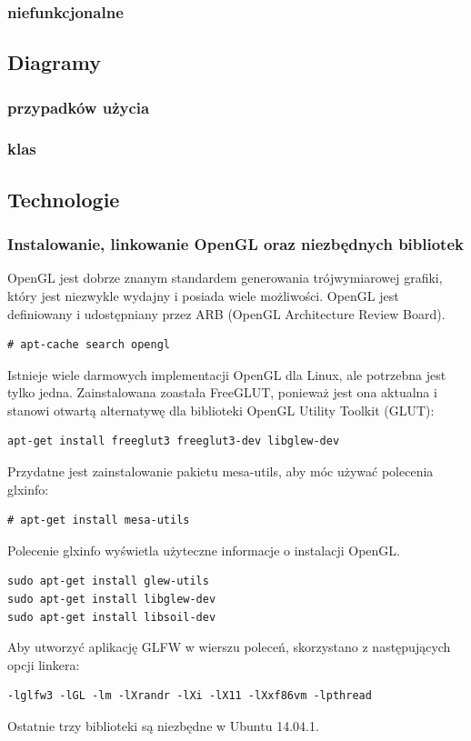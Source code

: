 \subsubsection{niefunkcjonalne}

\subsection{Diagramy}
\subsubsection{przypadków użycia}
\subsubsection{klas}

\newpage
\subsection{Technologie}
\subsubsection{Instalowanie, linkowanie OpenGL oraz niezbędnych bibliotek}
OpenGL jest dobrze znanym standardem generowania trójwymiarowej grafiki, który jest niezwykle wydajny i posiada wiele możliwości. OpenGL jest definiowany i udostępniany przez ARB (OpenGL Architecture Review Board).
\begin{verbatim}
# apt-cache search opengl
\end{verbatim}
Istnieje wiele darmowych implementacji OpenGL dla Linux, ale potrzebna jest tylko jedna. Zainstalowana zoastała FreeGLUT, ponieważ jest ona aktualna i stanowi otwartą alternatywę dla biblioteki OpenGL Utility Toolkit (GLUT):
\begin{verbatim}
apt-get install freeglut3 freeglut3-dev libglew-dev
\end{verbatim}
Przydatne jest zainstalowanie pakietu mesa-utils, aby móc używać polecenia glxinfo:
\begin{verbatim}
# apt-get install mesa-utils
\end{verbatim}
Polecenie glxinfo wyświetla użyteczne informacje o instalacji OpenGL.
\begin{verbatim}
sudo apt-get install glew-utils
sudo apt-get install libglew-dev
sudo apt-get install libsoil-dev
\end{verbatim}
Aby utworzyć aplikację GLFW w wierszu poleceń, skorzystano z następujących opcji linkera:
\begin{verbatim}
-lglfw3 -lGL -lm -lXrandr -lXi -lX11 -lXxf86vm -lpthread
\end{verbatim}
Ostatnie trzy biblioteki są niezbędne w Ubuntu 14.04.1.

